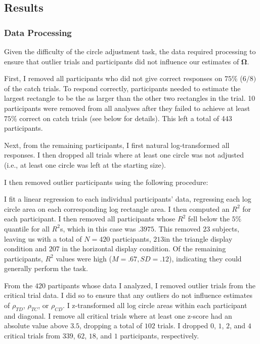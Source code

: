 \subsection{Results}
\subsubsection{Data Processing}
Given the difficulty of the circle adjustment task, the data required processing to ensure that outlier trials and participants did not influence our estimates of $\mathbf{\Omega}$.

First, I removed all participants who did not give correct responses on $75\%$ ($6/8)$ of the catch trials. To respond correctly, participants needed to estimate the largest rectangle to be the as larger than the other two rectangles in the trial. 10 participants were removed from all analyses after they failed to achieve at least $75\%$ correct on catch trials (see below for details). This left a total of 443 participants.

Next, from the remaining participants, I first natural log-transformed all responses. I then dropped all trials where at least one circle was not adjusted (i.e., at least one circle was left at the starting size).

I then removed outlier participants using the following procedure:

I fit a linear regression to each individual participants' data, regressing each log circle area on each corresponding log rectangle area. I then computed an $R^2$ for each participant. I then removed all participants whose $R^2$ fell below the $5\%$ quantile for all $R^2$s, which in this case was $.3975$. This removed $23$ subjects, leaving us with a total of $N=420$ participants, $213 $in the triangle display condition and $207$ in the horizontal display condition. Of the remaining participants, $R^2$ values were high ($M=.67,SD=.12$), indicating they could generally perform the task.

From the $420$ partipants whose data I analyzed, I removed outlier trials from the critical trial data. I did so to ensure that any outliers do not influence estimates of $\rho_{TD}$, $\rho_{TC}$, or $\rho_{CD}$. I z-transformed all log circle areas within each participant and diagonal. I remove all critical trials where at least one z-score had an absolute value above $3.5$, dropping a total of $102$ trials. I dropped $0$, $1$, $2$, and $4$ critical trials from $339$, $62$, $18$, and $1$ participants, respectively. 

